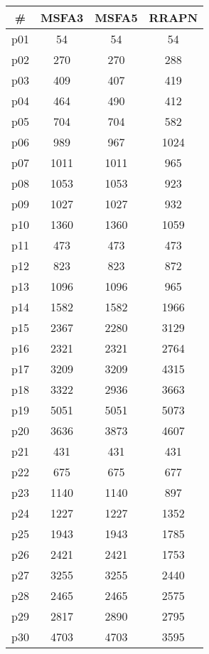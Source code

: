 \begin{tabular}{cccc}
\toprule
\textbf{\#} & \textbf{MSFA3} & \textbf{MSFA5} & \textbf{RRAPN}\\
\midrule
p01 & 54 & 54 & 54\\
p02 & 270 & 270 & 288\\
p03 & 409 & 407 & 419\\
p04 & 464 & 490 & 412\\
p05 & 704 & 704 & 582\\
p06 & 989 & 967 & 1024\\
p07 & 1011 & 1011 & 965\\
p08 & 1053 & 1053 & 923\\
p09 & 1027 & 1027 & 932\\
p10 & 1360 & 1360 & 1059\\
p11 & 473 & 473 & 473\\
p12 & 823 & 823 & 872\\
p13 & 1096 & 1096 & 965\\
p14 & 1582 & 1582 & 1966\\
p15 & 2367 & 2280 & 3129\\
p16 & 2321 & 2321 & 2764\\
p17 & 3209 & 3209 & 4315\\
p18 & 3322 & 2936 & 3663\\
p19 & 5051 & 5051 & 5073\\
p20 & 3636 & 3873 & 4607\\
p21 & 431 & 431 & 431\\
p22 & 675 & 675 & 677\\
p23 & 1140 & 1140 & 897\\
p24 & 1227 & 1227 & 1352\\
p25 & 1943 & 1943 & 1785\\
p26 & 2421 & 2421 & 1753\\
p27 & 3255 & 3255 & 2440\\
p28 & 2465 & 2465 & 2575\\
p29 & 2817 & 2890 & 2795\\
p30 & 4703 & 4703 & 3595\\
\bottomrule
\end{tabular}


